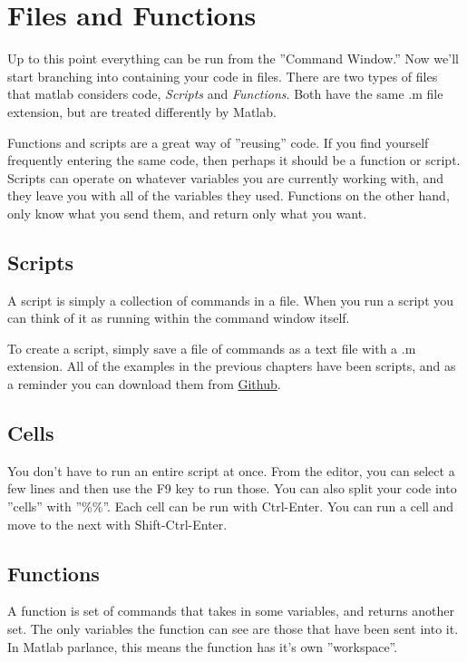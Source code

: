 
\pagebreak
\section{Files and Functions}
Up to this point everything can be run from the ''Command Window.''
 Now we'll start branching into containing your code in files.
 There are two types of files that matlab considers code, \emph{Scripts} and \emph{Functions}.
 Both have the same .m file extension, but are treated differently by Matlab.
 
Functions and scripts are a great way of ''reusing'' code.
 If you find yourself frequently entering the same code, then perhaps it should be a function or script.
 Scripts can operate on whatever variables you are currently working with, and they leave you with all of the variables they used.
 Functions on the other hand, only know what you send them, and return only what you want.

\subsection{Scripts}
A script is simply a collection of commands in a file.
 When you run a script you can think of it as running within the command window itself.
 
To create a script, simply save a file of commands as a text file with a .m extension.
 All of the examples in the previous chapters have been scripts, and as a reminder you can download them from \href{https://github.com/KEClaytor/QuickDirtyMatlab/tree/master/code}{Github}.

\begin{quote}

\end{quote}

\pagebreak
\subsection{Cells}
You don't have to run an entire script at once.
 From the editor, you can select a few lines and then use the F9 key to run those.
 You can also split your code into ''cells'' with ''\%\%''.
 Each cell can be run with Ctrl-Enter.
 You can run a cell and move to the next with Shift-Ctrl-Enter.

\begin{quote}

\end{quote}

\pagebreak
\subsection{Functions}
A function is set of commands that takes in some variables, and returns another set.
 The only variables the function can see are those that have been sent into it.
 In Matlab parlance, this means the function has it's own ''workspace''.
  
